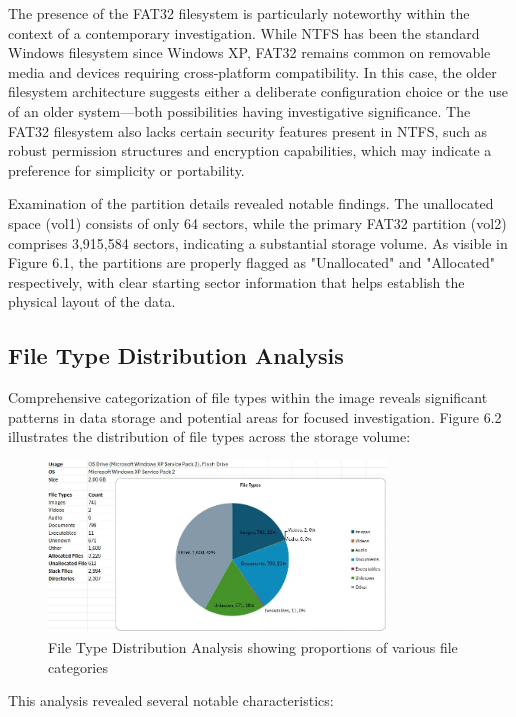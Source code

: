 The presence of the FAT32 filesystem is particularly noteworthy within the context of a contemporary investigation. While NTFS has been the standard Windows filesystem since Windows XP, FAT32 remains common on removable media and devices requiring cross-platform compatibility. In this case, the older filesystem architecture suggests either a deliberate configuration choice or the use of an older system—both possibilities having investigative significance. The FAT32 filesystem also lacks certain security features present in NTFS, such as robust permission structures and encryption capabilities, which may indicate a preference for simplicity or portability.

Examination of the partition details revealed notable findings. The unallocated space (vol1) consists of only 64 sectors, while the primary FAT32 partition (vol2) comprises 3,915,584 sectors, indicating a substantial storage volume. As visible in Figure 6.1, the partitions are properly flagged as "Unallocated" and "Allocated" respectively, with clear starting sector information that helps establish the physical layout of the data.

\subsection{File Type Distribution Analysis}
Comprehensive categorization of file types within the image reveals significant patterns in data storage and potential areas for focused investigation. Figure 6.2 illustrates the distribution of file types across the storage volume:

\begin{figure}[h]
    \centering
    \includegraphics[width=0.8\textwidth]{images/Evidence Examination/Image2.png}
    \caption{File Type Distribution Analysis showing proportions of various file categories}
    \label{fig:file_types}
\end{figure}

This analysis revealed several notable characteristics:

